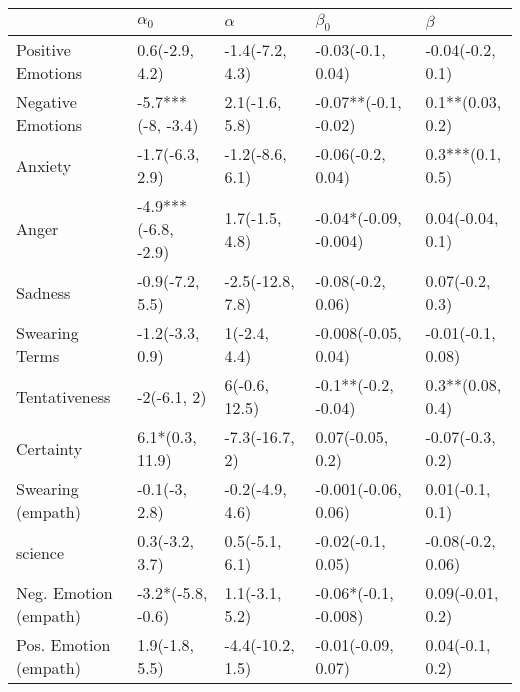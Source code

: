 \begin{tabular}{lllll}
\toprule
{} &           $\alpha_0$ &          $\alpha$ &              $\beta_0$ &            $\beta$ \\
\midrule
Positive Emotions     &       0.6(-2.9, 4.2) &   -1.4(-7.2, 4.3) &      -0.03(-0.1, 0.04) &   -0.04(-0.2, 0.1) \\
Negative Emotions     &    -5.7***(-8, -3.4) &    2.1(-1.6, 5.8) &   -0.07**(-0.1, -0.02) &   0.1**(0.03, 0.2) \\
Anxiety               &      -1.7(-6.3, 2.9) &   -1.2(-8.6, 6.1) &      -0.06(-0.2, 0.04) &   0.3***(0.1, 0.5) \\
Anger                 &  -4.9***(-6.8, -2.9) &    1.7(-1.5, 4.8) &  -0.04*(-0.09, -0.004) &   0.04(-0.04, 0.1) \\
Sadness               &      -0.9(-7.2, 5.5) &  -2.5(-12.8, 7.8) &      -0.08(-0.2, 0.06) &    0.07(-0.2, 0.3) \\
Swearing Terms        &      -1.2(-3.3, 0.9) &      1(-2.4, 4.4) &    -0.008(-0.05, 0.04) &  -0.01(-0.1, 0.08) \\
Tentativeness         &          -2(-6.1, 2) &     6(-0.6, 12.5) &    -0.1**(-0.2, -0.04) &   0.3**(0.08, 0.4) \\
Certainty             &      6.1*(0.3, 11.9) &    -7.3(-16.7, 2) &       0.07(-0.05, 0.2) &   -0.07(-0.3, 0.2) \\
Swearing (empath)     &        -0.1(-3, 2.8) &   -0.2(-4.9, 4.6) &    -0.001(-0.06, 0.06) &    0.01(-0.1, 0.1) \\
science               &       0.3(-3.2, 3.7) &    0.5(-5.1, 6.1) &      -0.02(-0.1, 0.05) &  -0.08(-0.2, 0.06) \\
Neg. Emotion (empath) &    -3.2*(-5.8, -0.6) &    1.1(-3.1, 5.2) &   -0.06*(-0.1, -0.008) &   0.09(-0.01, 0.2) \\
Pos. Emotion (empath) &       1.9(-1.8, 5.5) &  -4.4(-10.2, 1.5) &     -0.01(-0.09, 0.07) &    0.04(-0.1, 0.2) \\
\bottomrule
\end{tabular}
